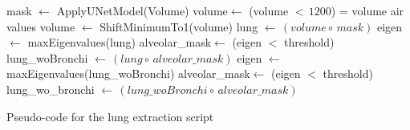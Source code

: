 \documentclass{standalone}
\begin{document}
	
	\begin{algorithm}
		
		\SetAlgoLined
		\DontPrintSemicolon
		

		\;
		
		mask $\leftarrow$ ApplyUNetModel(Volume)\;
		volume$\leftarrow$ (volume $<\,1200$) = volume air values\;
		volume $\leftarrow$ ShiftMinimumTo1(volume)\;
		lung $\leftarrow\,(volume\circ\, mask)$	\;
		\;
		eigen $\leftarrow$ maxEigenvalues(lung)\;
		alveolar\_mask$\leftarrow$ (eigen $<$ threshold)\;
		lung\_woBronchi $\leftarrow\,(lung\circ\, alveolar\_mask)$\; 
		\;
		eigen $\leftarrow$ maxEigenvalues(lung\_woBronchi)\;
		alveolar\_mask$\leftarrow$ (eigen $<$ threshold)\;
		lung\_wo\_bronchi $\leftarrow\,(lung\_woBronchi\circ\, alveolar\_mask)$\; 		
		
	\caption{Pseudo-code for the lung extraction script}	\label{alg:lungExtraction}
		
	\end{algorithm}
	
\end{document}
